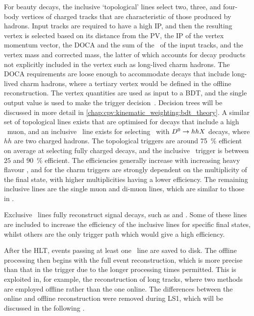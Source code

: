 For beauty decays, the inclusive `topological' lines select two, three, and 
four-body vertices of charged tracks that are characteristic of those produced 
by \PB hadrons.
Input tracks are required to have a high \ac{IP}, and then the resulting vertex 
is selected based on its distance from the \ac{PV}, the \ac{IP} of the vertex 
momentum vector, the \ac{DOCA} and the sum of the \pT\ of the input tracks, and 
the vertex mass and corrected mass, the latter of which accounts for decay 
products not explicitly included in the vertex such as long-lived charm 
hadrons.
The \ac{DOCA} requirements are loose enough to accommodate \PB decays that 
include long-lived charm hadrons, where a tertiary vertex would be defined in 
the offline reconstruction.
The vertex quantities are used as input to a \ac{BDT}, and the single output 
value is used to make the trigger 
decision~\cite{Gligorov:2011qxa,Gligorov:1384380}.
Decision trees will be discussed in more detail in 
\cref{chap:cpv:kinematic_weighting:bdt_theory}.
A similar set of topological lines exists that are optimised for \PB decays 
that include a high \pT\ muon, and an inclusive \PDstarp\ line exists for 
selecting \DstToDzpi\ with $D^{0} \to hhX$ decays, where $hh$ are two 
charged hadrons.
The topological \PB triggers are around \SI{75}{\percent} efficient on average 
at selecting fully charged \PB decays, and the inclusive \PDstarp\ trigger is 
between $25$ and \SI{90}{\percent} efficient.
The efficiencies generally increase with increasing heavy flavour \pT, and for 
the charm triggers are strongly dependent on the multiplicity of the final 
state, with higher multiplicities having a lower efficiency.
The remaining inclusive lines are the single muon and di-muon lines, which are 
similar to those in \hltone.

Exclusive \hlttwo\ lines fully reconstruct signal decays, such as 
\decay{\PB}{\pippim} and \decay{\PLambdac}{\Pproton\PKminus\Ppiplus}.
Some of these lines are included to increase the efficiency of the inclusive 
lines for specific final states, whilst others are the only trigger path which 
would give a high efficiency.

After the \acl{HLT}, events passing at least one \hlttwo\ line are saved to 
disk.
The offline processing then begins with the full event reconstruction, which is 
more precise than that in the trigger due to the longer processing times 
permitted.
This is exploited in, for example, the reconstruction of long tracks, where two 
methods are employed offline rather than the one online.
The differences between the online and offline reconstruction were removed 
during \ac{LS1}, which will be discussed in the following 
.


